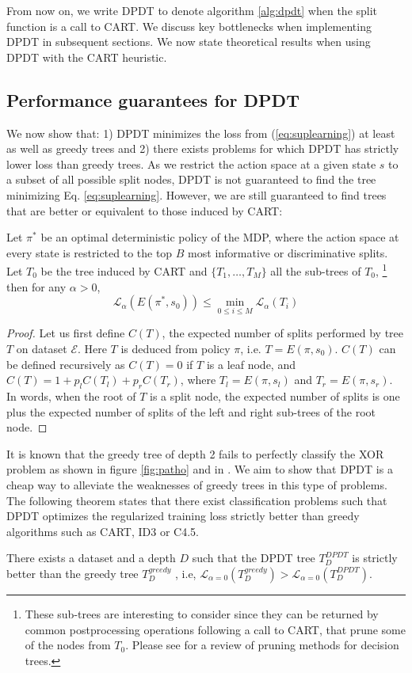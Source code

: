 From now on, we write DPDT to denote algorithm \ref{alg:dpdt} when the split function is a call to CART. We discuss key bottlenecks when implementing DPDT in subsequent sections. We now state theoretical results when using DPDT with the CART heuristic. 

\subsection{Performance guarantees for DPDT}
We now show that: 1) DPDT minimizes the loss from (\ref{eq:suplearning}) at least as well as greedy trees and 2) there exists problems for which DPDT has strictly lower loss than greedy trees. 
As we restrict the action space at a given state $s$ to a subset of all possible split nodes, DPDT is not guaranteed to find the tree minimizing Eq. \ref{eq:suplearning}. However, we are still guaranteed to find trees that are better or equivalent to those induced by CART:
\begin{theorem}\label{prop:cart}
Let $\pi^*$ be an optimal deterministic policy of the MDP, where the action space at every state is restricted to the top $B$ most informative or discriminative splits. 
Let $T_0$ be the tree induced by CART and $\{T_1,\dots,T_M\}$ all the sub-trees of $T_0$, \footnote{These sub-trees are interesting to consider since they can be returned by common postprocessing operations following a call to CART, that prune some of the nodes from $T_0$. Please see \cite{pruning1} for a review of pruning methods for decision trees.} then for any $\alpha > 0$, 
\[
{\mathcal L}_\alpha(E(\pi^*, s_0)) \leq \min_{0\leq i\leq M}{\mathcal L}_\alpha(T_i)
\]
\end{theorem}

\begin{proof}
Let us first define $C(T)$, the expected number of splits performed by tree $T$ on dataset $\mathcal E$. 
Here $T$ is deduced from policy $\pi$, i.e. $T=E(\pi, s_0)$. $C(T)$ can be defined recursively as $C(T) = 0$ if $T$ is a leaf node, and $C(T) = 1 + p_l C(T_l) + p_r  C(T_r)$, where $T_l = E(\pi, s_l)$ and $T_r = E(\pi, s_r)$. 
In words, when the root of $T$ is a split node, the expected number of splits is one plus the expected number of splits of the left and right sub-trees of the root node.
\end{proof}

It is known that the greedy tree of depth 2 fails to perfectly classify the XOR problem as shown in figure \ref{fig:patho} and in \cite{Murthy,how-eff}. We aim to show that DPDT is a cheap way to alleviate the weaknesses of greedy trees in this type of problems. The following theorem states that there exist classification problems such that DPDT optimizes the regularized training loss strictly better than greedy algorithms such as CART, ID3 or C4.5.
\begin{theorem}\label{thm:better_greedy}
There exists a dataset and a depth $D$ such that the DPDT tree $T^{DPDT}_D$ is strictly better than the greedy tree $T^{greedy}_{D}$ , i.e, $\mathcal{L}_{\alpha=0}(T^{greedy}_{D}) > \mathcal{L}_{\alpha=0}(T^{DPDT}_{D})$.
\end{theorem}

